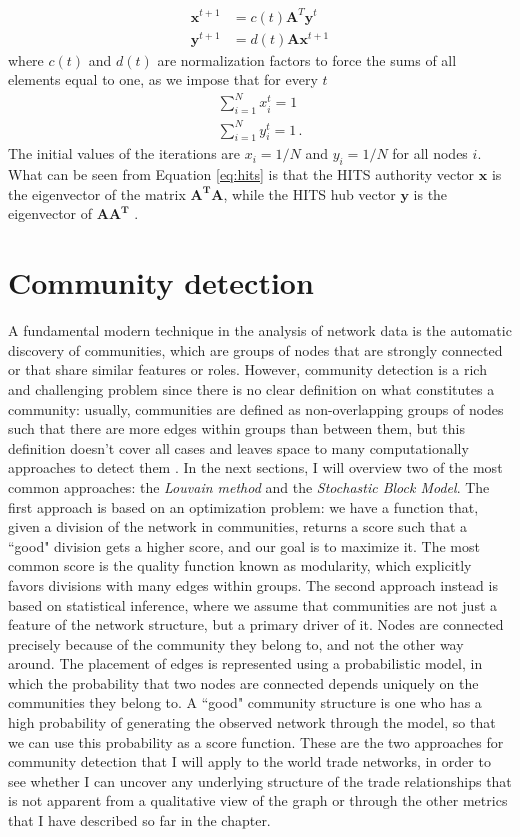 \begin{align}\label{eq:hits}
    \mathbf{x}^{t+1} &= c(t) \mathbf{A}^T \mathbf{y}^t \\
    \mathbf{y}^{t+1} &= d(t) \mathbf{A} \mathbf{x}^{t+1} 
\end{align}
where $c(t)$ and $d(t)$ are normalization factors to force the sums of all elements equal to one, as we impose that for every $t$
\begin{align*}
    \sum_{i=1}^N x_i^{t} = 1 \\
    \sum_{i=1}^N y_i^{t} = 1 \,.
\end{align*}
The initial values of the iterations are $x_i = 1/N$ and $y_i = 1/N$ for all nodes $i$. What can be seen from Equation \ref{eq:hits} is that the HITS authority vector $\mathbf{x}$ is the eigenvector of the matrix $\mathbf{A^T A}$, while the HITS hub vector $\mathbf{y}$ is the eigenvector of $\mathbf{A A^T}$ \cite{deguchi2014hubs}.

\section{Community detection}
A fundamental modern technique in the analysis of network data is the automatic discovery of communities, which are groups of nodes that are strongly connected or that share similar features or roles. However, community detection is a rich and challenging problem since there is no clear definition on what constitutes a community: usually, communities are defined as non-overlapping groups of nodes such that there are more edges within groups than between them, but this definition doesn't cover all cases and leaves space to many computationally approaches to detect them \cite{fortunato202220years}. In the next sections, I will overview two of the most common approaches: the \textit{Louvain method} and the \textit{Stochastic Block Model}. 
The first approach is based on an optimization problem: we have a function that, given a division of the network in communities, returns a score such that a ``good" division gets a higher score, and our goal is to maximize it. The most common score is the quality function known as modularity, which explicitly favors divisions with many edges within groups.
The second approach instead is based on statistical inference, where we assume that communities are not just a feature of the network structure, but a primary driver of it. Nodes are connected precisely because of the community they belong to, and not the other way around. The placement of edges is represented using a probabilistic model, in which the probability that two nodes are connected depends uniquely on the communities they belong to. A ``good" community structure is one who has a high probability of generating the observed network through the model, so that we can use this probability as a score function.
These are the two approaches for community detection that I will apply to the world trade networks, in order to see whether I can uncover any underlying structure of the trade relationships that is not apparent from a qualitative view of the graph or through the other metrics that I have described so far in the chapter.


